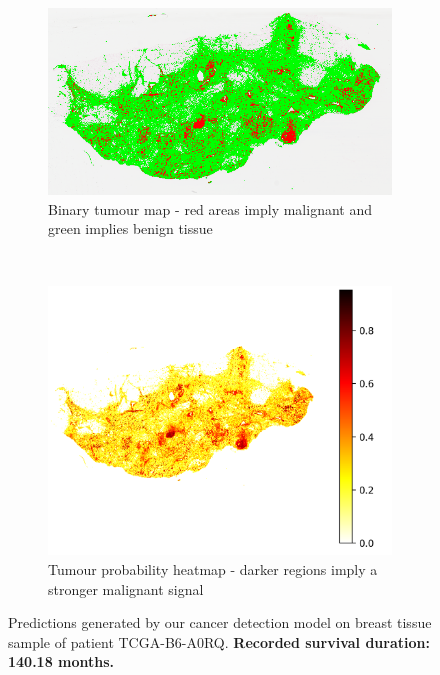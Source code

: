 \documentclass{l4proj}
\begin{document}
\begin{appendices}
\begin{figure}[hbt!]
    \centering
    \hspace{-1cm}
    \begin{subfigure}[b]{0.4\textwidth}
        \includegraphics[scale=0.5]{images/appendix_b/TCGA-B6-A0RQ-mss.png}
        \vspace{0.5cm}
        \caption{Binary tumour map - red areas imply malignant and green implies benign tissue}
    \end{subfigure}\hfill%
    ~~
    \begin{subfigure}[b]{0.4\textwidth}
        \hspace{-1cm}
        \includegraphics[scale=0.75]{images/appendix_b/TCGA-B6-A0RQ-mmi.png}
        \caption{Tumour probability heatmap - darker regions imply a stronger malignant signal}
    \end{subfigure}
    \vspace{1cm}
    \caption{Predictions generated by our cancer detection model on breast tissue sample of patient TCGA-B6-A0RQ. \textbf{Recorded survival duration: 140.18 months.}}
    \label{fig:TCGA-B6-A0RQ}
\end{figure}



\end{appendices}
\end{document}
